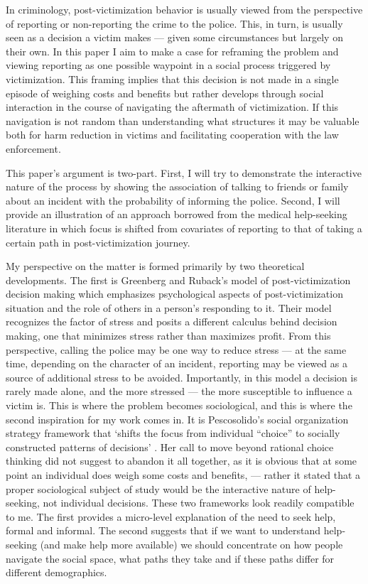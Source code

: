 \documentclass[]{interact}
\theoremstyle{plain}%
\theoremstyle{definition}
\theoremstyle{remark}
\newcommand\citep{\parencite}
\begin{document}
	In criminology, post-victimization behavior is usually viewed from the perspective of reporting or non-reporting the crime to the police. This, in turn, is usually seen as a decision a victim makes --- given some circumstances but largely on their own. In this paper I aim to make a case for reframing the problem and viewing reporting as one possible waypoint in a social process triggered by victimization. This framing implies that this decision is not made in a single episode of weighing costs and benefits but rather develops through social interaction in the course of navigating the aftermath of victimization. If this navigation is not random than understanding what structures it may be valuable both for harm reduction in victims and facilitating cooperation with the law enforcement.
	
	This paper's argument is two-part. First, I will try to demonstrate the interactive nature of the process by showing the association of talking to friends or family about an incident with the probability of informing the police. Second, I will provide an illustration of an approach borrowed from the medical help-seeking literature in which focus is shifted from covariates of reporting to that of taking a certain path in post-victimization journey. 
	
	My perspective on the matter is formed primarily by two theoretical developments. The first is Greenberg and Ruback's model of post-victimization decision making \citep{ruback1984social, greenberg1992after} which emphasizes psychological aspects of post-victimization situation and the role of others in a person's responding to it. Their model recognizes the factor of stress and posits a different calculus behind decision making, one that minimizes stress rather than maximizes profit. From this perspective, calling the police may be one way to reduce stress --- at the same time, depending on the character of an incident, reporting may be viewed as a source of additional stress to be avoided. Importantly, in this model a decision is rarely made alone, and the more stressed --- the more susceptible to influence a victim is. This is where the problem becomes sociological, and this is where the second inspiration for my work comes in. It is Pescosolido's social organization strategy framework that `shifts the focus from individual ``choice'' to socially constructed patterns of decisions' \citep{pescosolido1992beyond}. Her call to move beyond rational choice thinking did not suggest to abandon it all together, as it is obvious that at some point an individual does weigh some costs and benefits, --- rather it stated that a proper sociological subject of study would be the interactive nature of help-seeking, not individual decisions. These two frameworks look readily compatible to me. The first provides a micro-level explanation of the need to seek help, formal and informal. The second suggests that if we want to understand help-seeking (and make help more available) we should concentrate on how people navigate the social space, what paths they take and if these paths differ for different demographics. 
	
\end{document}
